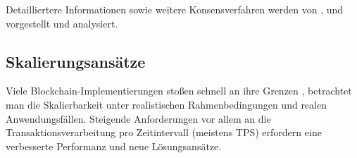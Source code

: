 Detailliertere Informationen sowie weitere Konsensverfahren werden von \cite{Salimitari2018ASO}, \cite{overview2017} und \cite{consensusIOT2018} vorgestellt und analysiert.


\subsection{Skalierungsansätze}
\label{subsec:fundamentals:dlt:scaling}
Viele Blockchain-Implementierungen stoßen schnell an ihre Grenzen \cite{overview2017}, betrachtet man die Skalierbarkeit unter realistischen Rahmenbedingungen und realen Anwendungsfällen. Steigende Anforderungen vor allem an die Transaktionsverarbeitung pro Zeitintervall \cite{Macdonald2017} (meistens \ac{TPS}) erfordern eine verbesserte Performanz und neue Lösungsansätze.\\
